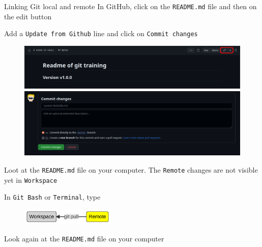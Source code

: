 \documentclass[10pt]{beamer}
\begin{document}
\begin{frame}[fragile]{Linking Git local and remote}
\protect\hypertarget{synchronization-from-the-remote}{}
In GitHub, click on the \texttt{README.md} file and then on the edit
button

Add a \texttt{Update\ from\ Github} line and click on
\texttt{Commit\ changes}

\begin{figure}

\begin{minipage}[b]{0.45\linewidth}

{\centering 

\includegraphics[width=\textwidth]{img/readme-edit.png}

}

\end{minipage}%
%
\begin{minipage}[b]{0.45\linewidth}

{\centering 

\includegraphics[width=\textwidth]{img/readme-edit-2.png}

}

\end{minipage}%

\end{figure}

Loot at the \verb+README.md+ file on your computer. The \texttt{Remote} changes are not visible yet in
\texttt{Workspace}

In \texttt{Git\ Bash} or \texttt{Terminal}, type 

\begin{center}
\begin{figure}[H]
     \includegraphics[width=0.4\textwidth]{mermaid/mermaid-figure-13.png}
     \end{figure}
\end{center}

Look again at the \verb+README.md+ file on your computer


\end{frame}
\end{document}
